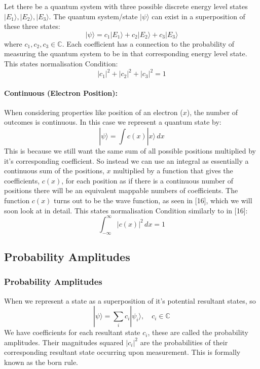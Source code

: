 Let there be a quantum system with three possible discrete energy level states \( |E_1\rangle, |E_2\rangle, |E_3\rangle \). The quantum system/state \(|\psi\rangle\) can exist in a superposition of these three states:
\begin{equation}
|\psi\rangle = c_1 |E_1\rangle + c_2 |E_2\rangle + c_3 |E_3\rangle
\end{equation}
where \( c_1, c_2, c_3 \in \mathbb{C} \). Each coefficient has a connection to the probability of measuring the quantum system to be in that corresponding energy level state. This states normalisation Condition:
\begin{equation}
|c_1|^2 + |c_2|^2 + |c_3|^2 = 1
\end{equation}

\paragraph{Continuous (Electron Position):}

When considering properties like position of an electron ($x$), the number of outcomes is continuous. In this case we represent a quantum state by:
\begin{equation}
|\psi\rangle = \int c(x) |x\rangle \, dx
\end{equation}
This is because we still want the same sum of all possible positions multiplied by it's corresponding coefficient. So instead we can use an integral as essentially a continuous sum of the positions, $x$ multiplied by a function that gives the coefficients, $c(x)$, for each position as if there is a continuous number of positions there will be an equivalent mappable numbers of coefficients. The function \( c(x) \) turns out to be the wave function, as seen in [16], which we will soon look at in detail. This states normalisation Condition similarly to in [16]:
\begin{equation}
\int_{-\infty}^{\infty} |c(x)|^2 \, dx = 1
\end{equation}


\subsection{Probability Amplitudes}
\subsubsection{Probability Amplitudes}
\noindent When we represent a state as a superposition of it's potential resultant states, so
\begin{equation}
     | \psi \rangle  = \sum_i c_i | \psi_i \rangle, \quad c_i \in \mathbb{C}
\end{equation}
We have coefficients for each resultant state $c_i$, these are called the probability amplitudes. Their magnitudes squared $|c_i|^2$ are the probabilities of their corresponding resultant state occurring upon measurement. This is formally known as the born rule.



